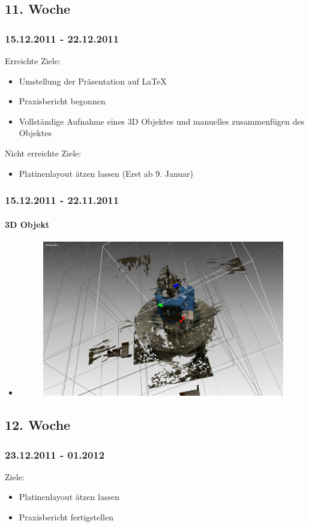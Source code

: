 \documentclass[ngerman]{beamer}
\begin{document}
\subsection{11. Woche}
\begin{frame}\frametitle{15.12.2011 - 22.12.2011}
\label{Aktuelle Folie}
Erreichte Ziele:
\begin{itemize}
\item Umstellung der Präsentation auf \LaTeX{}
\item Praxisbericht begonnen
\item Vollständige Aufnahme eines 3D Objektes und manuelles zusammenfügen
des Objektes
\end{itemize}
Nicht erreichte Ziele:
\begin{itemize}
\item Platinenlayout ätzen lassen (Erst ab 9. Januar)
\end{itemize}
\end{frame}
\begin{frame}\frametitle{15.12.2011 - 22.11.2011}
\framesubtitle{3D Objekt}
\begin{itemize}
\item 
\begin{figure}
\caption{\protect\includegraphics[scale=0.5]{Motor_vollstaendig_schlecht}}
\end{figure}

\end{itemize}
\end{frame}
\subsection{12. Woche}
\begin{frame}\frametitle{23.12.2011 - 01.2012}
Ziele:
\begin{itemize}
	\item Platinenlayout ätzen lassen
	\item Praxisbericht fertigstellen
\end{itemize}
\end{frame}
\end{document}
